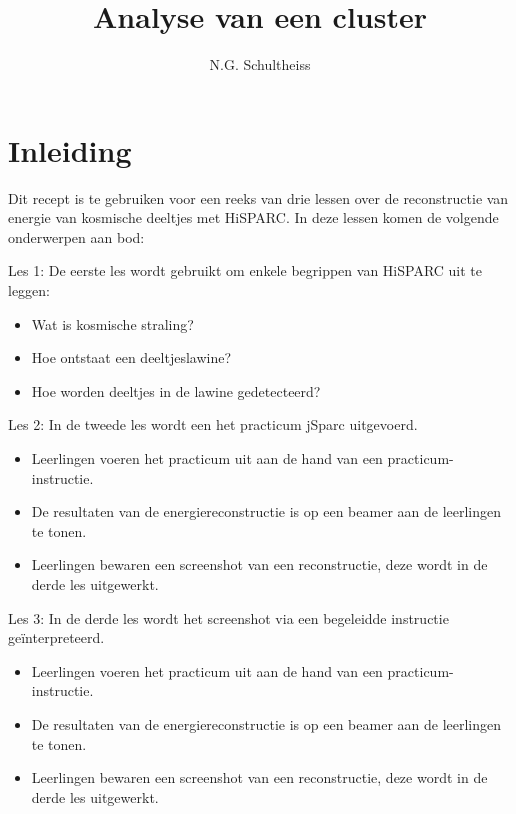 

\title{Analyse van een cluster}
\author{N.G. Schultheiss}



\maketitle

\section{Inleiding}

Dit recept is te gebruiken voor een reeks van drie lessen over de reconstructie van energie van kosmische deeltjes met HiSPARC. In deze lessen komen de volgende onderwerpen aan bod:

Les 1: De eerste les wordt gebruikt om enkele begrippen van HiSPARC uit te leggen:

\begin{itemize}
\item Wat is kosmische straling?
\item Hoe ontstaat een deeltjeslawine?
\item Hoe worden deeltjes in de lawine gedetecteerd?
\end{itemize}

Les 2: In de tweede les wordt een het practicum jSparc uitgevoerd.

\begin{itemize}
\item Leerlingen voeren het practicum uit aan de hand van een practicum-instructie.
\item De resultaten van de energiereconstructie is op een beamer aan de leerlingen te tonen.
\item Leerlingen bewaren een screenshot van een reconstructie, deze wordt in de derde les uitgewerkt.
\end{itemize}

Les 3: In de derde les wordt het screenshot via een begeleidde instructie ge\"interpreteerd.
\begin{itemize}
\item Leerlingen voeren het practicum uit aan de hand van een practicum-instructie.
\item De resultaten van de energiereconstructie is op een beamer aan de leerlingen te tonen.
\item Leerlingen bewaren een screenshot van een reconstructie, deze wordt in de derde les uitgewerkt.
\end{itemize}

